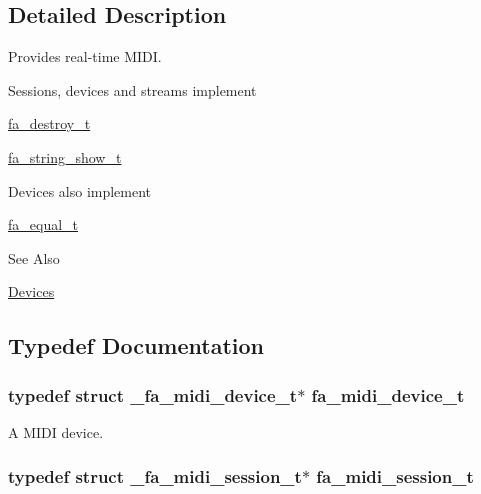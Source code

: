 \subsection{Detailed Description}
Provides real-\/time M\-I\-D\-I. \begin{DoxyParagraph}{Sessions, devices and streams implement }

\begin{DoxyItemize}
\item \hyperlink{structfa__destroy__t}{fa\-\_\-destroy\-\_\-t}
\item \hyperlink{structfa__string__show__t}{fa\-\_\-string\-\_\-show\-\_\-t}
\end{DoxyItemize}
\end{DoxyParagraph}
\begin{DoxyParagraph}{Devices also implement }

\begin{DoxyItemize}
\item \hyperlink{structfa__equal__t}{fa\-\_\-equal\-\_\-t}
\end{DoxyItemize}
\end{DoxyParagraph}
\begin{DoxySeeAlso}{See Also}

\begin{DoxyItemize}
\item \hyperlink{md__devices_Devices}{Devices} 
\end{DoxyItemize}
\end{DoxySeeAlso}


\subsection{Typedef Documentation}
\hypertarget{group___fa_midi_gabbbfd1ec30a186768ba2744e46bacc9b}{
\subsubsection[{fa\-\_\-midi\-\_\-device\-\_\-t}]{\setlength{\rightskip}{0pt plus 5cm}typedef struct \-\_\-fa\-\_\-midi\-\_\-device\-\_\-t$\ast$ {\bf fa\-\_\-midi\-\_\-device\-\_\-t}}}\label{group___fa_midi_gabbbfd1ec30a186768ba2744e46bacc9b}


A M\-I\-D\-I device. 

\hypertarget{group___fa_midi_ga222964548b932c6f53b575b23629530e}{
\subsubsection[{fa\-\_\-midi\-\_\-session\-\_\-t}]{\setlength{\rightskip}{0pt plus 5cm}typedef struct \-\_\-fa\-\_\-midi\-\_\-session\-\_\-t$\ast$ {\bf fa\-\_\-midi\-\_\-session\-\_\-t}}}\label{group___fa_midi_ga222964548b932c6f53b575b23629530e}


